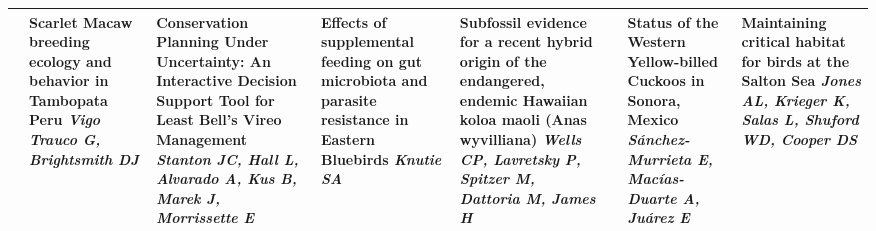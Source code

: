 \begin{tabular}{|x{0.85cm}|x{2.85cm}|x{2.85cm}|x{2.85cm}|x{2.85cm}|a{2.85cm}|a{2.85cm}|a{2.85cm}|}
&Scarlet Macaw breeding ecology and behavior in Tambopata Peru \newline \newline \textit{Vigo Trauco G, Brightsmith DJ} & Conservation Planning Under Uncertainty: An Interactive Decision Support Tool for Least Bell's Vireo Management \newline \newline \textit{Stanton JC, Hall L, Alvarado A, Kus B, Marek J, Morrissette E} & Effects of supplemental feeding on gut microbiota and parasite resistance in Eastern Bluebirds \newline \newline \textit{Knutie SA} & Subfossil evidence for a recent hybrid origin of the endangered, endemic Hawaiian koloa maoli (Anas wyvilliana) \newline \newline \textit{Wells CP, Lavretsky P, Spitzer M, Dattoria M, James H} &  \newline \newline \textit{} & Status of the Western Yellow-billed Cuckoos in Sonora, Mexico \newline \newline \textit{S\'{a}nchez-Murrieta E, Mac\'{i}as-Duarte A, Ju\'{a}rez E} & Maintaining critical habitat for birds at the Salton Sea \newline \newline \textit{Jones AL, Krieger K, Salas L, Shuford WD, Cooper DS}\\
\hline

\end{tabular}
